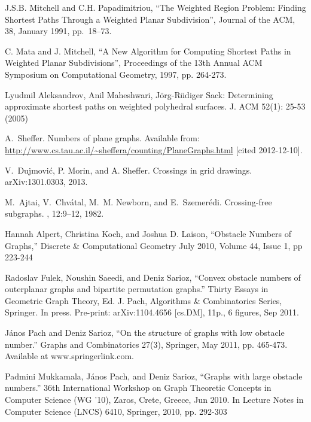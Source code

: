 \documentclass{patmorin}
\begin{document}

\begin{thebibliography}{1}

\newcommand{\doi}[1]{}

J.S.B. Mitchell and C.H. Papadimitriou, ``The Weighted Region Problem: Finding
Shortest Paths Through a Weighted Planar Subdivision'', Journal of the ACM, 38,
January 1991, pp.~18--73.

C. Mata and J. Mitchell, ``A New Algorithm for Computing Shortest Paths in
Weighted Planar Subdivisions'', Proceedings of the 13th Annual ACM Symposium
on Computational Geometry, 1997, pp. 264-273.

Lyudmil Aleksandrov, Anil Maheshwari, J\"org-R\"udiger Sack: Determining
approximate shortest paths on weighted polyhedral surfaces. J. ACM 52(1):
25-53 (2005)

A.~Sheffer.
\newblock Numbers of plane graphs.
\newblock Available from:
  \url{http://www.cs.tau.ac.il/~sheffera/counting/PlaneGraphs.html} [cited
  2012-12-10].

V.~Dujmovi\'c, P. Morin, and A. Sheffer.
\newblock Crossings in grid drawings.
\newblock arXiv:1301.0303, 2013.

M.~Ajtai, V.~Chv\'atal, M.~M. Newborn, and E.~Szemer\'edi.
\newblock Crossing-free subgraphs.
, 12:9--12, 1982.


Hannah Alpert, Christina Koch, and Joshua D. Laison, ``Obstacle Numbers
of Graphs,'' Discrete \& Computational Geometry July 2010, Volume 44,
Issue 1, pp 223-244

Radoslav Fulek, Noushin Saeedi, and Deniz Sarioz, ``Convex obstacle numbers of outerplanar graphs and bipartite permutation graphs.'' Thirty Essays in Geometric Graph Theory, Ed. J. Pach, Algorithms \& Combinatorics Series, Springer. In press. Pre-print: arXiv:1104.4656 [cs.DM], 11p., 6 figures, Sep 2011.

J\'anos Pach and Deniz Sarioz, ``On the structure of graphs with low obstacle number.'' Graphs and Combinatorics 27(3), Springer, May 2011, pp. 465-473. Available at www.springerlink.com.

Padmini Mukkamala, János Pach, and Deniz Sarioz, ``Graphs with large obstacle numbers.'' 36th International Workshop on Graph Theoretic Concepts in Computer Science (WG '10), Zaros, Crete, Greece, Jun 2010. In Lecture Notes in Computer Science (LNCS) 6410, Springer, 2010, pp. 292-303


\end{thebibliography}
\end{document}
